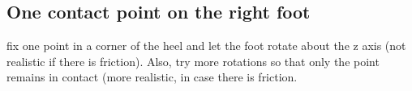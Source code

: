 \documentclass[11pt,a4paper]{article}
\begin{document}






\subsection{One contact point on the right foot}
fix one point in a corner of the heel and let the foot rotate about the z axis (not realistic if there is friction). Also, try more rotations so that only the point remains in contact (more realistic, in case there is friction.



%
%
\end{document}
